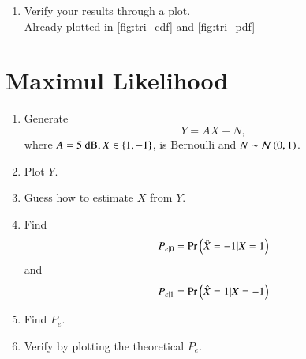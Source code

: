 \documentclass[journal,12pt,twocolumn]{IEEEtran}
\renewcommand\thesection{\arabic{section}}
\begin{document}
\begin{enumerate}[label=\thesection.\arabic*
        ,ref=\thesection.\theenumi]
    \item Verify your results through a plot.\\
          \solution
          Already plotted in \autoref{fig:tri_cdf} and \autoref{fig:tri_pdf}

\end{enumerate}
\section{Maximul Likelihood}
\begin{enumerate}[label=\thesection.\arabic*
        ,ref=\thesection.\theenumi]
    \item Generate
          \begin{equation}
              Y = AX+N,
          \end{equation}
          where $A = 5 \text{ dB}, X \in \left\{1,-1\right\}$,  is Bernoulli and $N \sim \mathcal{N}\left(0,1\right)$.
    \item Plot $Y$.
    \item Guess how to estimate $X$ from $Y$.
    \item
          \label{ml-ch4_sim}
          Find
          \begin{equation}
              P_{e|0} = \Pr\left(\hat{X} = -1|X=1\right)
          \end{equation}
          and
          \begin{equation}
              P_{e|1} = \Pr\left(\hat{X} = 1|X=-1\right)
          \end{equation}
    \item Find $P_e$.
    \item
          Verify by plotting  the theoretical $P_e$.
\end{enumerate}
\end{document}
